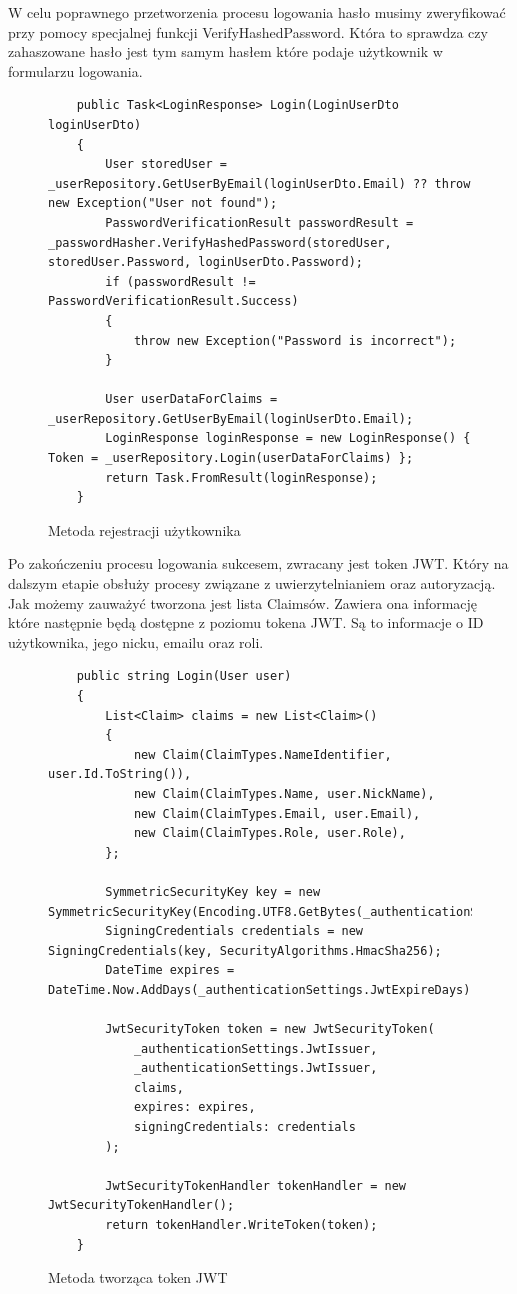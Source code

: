 \documentclass[a4paper,twoside,12pt]{book}
\begin{document}
W celu poprawnego przetworzenia procesu logowania hasło musimy zweryfikować przy pomocy specjalnej funkcji VerifyHashedPassword. Która to sprawdza czy zahaszowane hasło jest tym samym hasłem które podaje użytkownik w formularzu logowania. 

    \begin{figure}[H]
        \begin{lstlisting}
    public Task<LoginResponse> Login(LoginUserDto loginUserDto)
    {
        User storedUser = _userRepository.GetUserByEmail(loginUserDto.Email) ?? throw new Exception("User not found");
        PasswordVerificationResult passwordResult = _passwordHasher.VerifyHashedPassword(storedUser, storedUser.Password, loginUserDto.Password);
        if (passwordResult != PasswordVerificationResult.Success)
        {
            throw new Exception("Password is incorrect");
        }

        User userDataForClaims = _userRepository.GetUserByEmail(loginUserDto.Email);
        LoginResponse loginResponse = new LoginResponse() { Token = _userRepository.Login(userDataForClaims) };
        return Task.FromResult(loginResponse);
    }
        \end{lstlisting}
    \caption{Metoda rejestracji użytkownika}
    \label{fig:pseudokod:listings}
    \end{figure}

Po zakończeniu procesu logowania sukcesem, zwracany jest token JWT. Który na dalszym etapie obsłuży procesy związane z uwierzytelnianiem oraz autoryzacją. Jak możemy zauważyć tworzona jest lista Claimsów. Zawiera ona informację które następnie będą dostępne z poziomu tokena JWT. Są to informacje o ID użytkownika, jego nicku, emailu oraz roli.

        \begin{figure}[H]
        \begin{lstlisting}
    public string Login(User user)
    {
        List<Claim> claims = new List<Claim>()
        {
            new Claim(ClaimTypes.NameIdentifier, user.Id.ToString()),
            new Claim(ClaimTypes.Name, user.NickName),
            new Claim(ClaimTypes.Email, user.Email),
            new Claim(ClaimTypes.Role, user.Role),
        };

        SymmetricSecurityKey key = new SymmetricSecurityKey(Encoding.UTF8.GetBytes(_authenticationSettings.JwtKey));
        SigningCredentials credentials = new SigningCredentials(key, SecurityAlgorithms.HmacSha256);
        DateTime expires = DateTime.Now.AddDays(_authenticationSettings.JwtExpireDays);

        JwtSecurityToken token = new JwtSecurityToken(
            _authenticationSettings.JwtIssuer,
            _authenticationSettings.JwtIssuer,
            claims,
            expires: expires,
            signingCredentials: credentials
        );

        JwtSecurityTokenHandler tokenHandler = new JwtSecurityTokenHandler();
        return tokenHandler.WriteToken(token);
    }
        \end{lstlisting}
    \caption{Metoda tworząca token JWT}
    \label{fig:pseudokod:listings}
    \end{figure}
\end{document}

